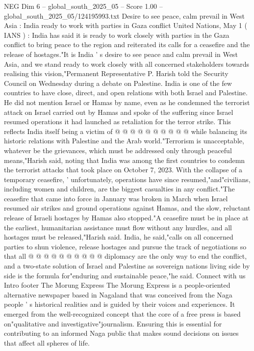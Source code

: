 \begin{textsample}{NEG Dim 6 – global\_south\_2025\_05 – Score 1.00 – global\_south\_2025\_05/124195993.txt}  \label{ex:f6_neg_393}
Desire to see peace, calm prevail in West Asia : India ready to work with parties in Gaza conflict United Nations, May 1 ( IANS ) : India has said it is ready to work closely with parties in the Gaza conflict to bring peace to the region and reiterated its calls for a ceasefire and the release of hostages."It is India ' s desire to see peace and calm prevail in West Asia, and we stand ready to work closely with all concerned stakeholders towards realising this vision,"Permanent Representative P.
Harish told the Security Council on Wednesday during a debate on Palestine.
India is one of the few countries to have close, direct, and open relations with both Israel and Palestine.
He did not mention Israel or Hamas by name, even as he condemned the terrorist attack on Israel carried out by Hamas and spoke of the suffering since Israel resumed operations it had launched as retaliation for the terror strike.
This reflects India itself being a victim of @ @ @ @ @ @ @ @ @ @ while balancing its historic relations with Palestine and the Arab world."Terrorism is unacceptable, whatever be the grievances, which must be addressed only through peaceful means,"Harish said, noting that India was among the first countries to condemn the terrorist attacks that took place on October 7, 2023.
With the collapse of a temporary ceasefire, ' unfortunately, operations have since resumed,"and"civilians, including women and children, are the biggest casualties in any conflict."The ceasefire that came into force in January was broken in March when Israel resumed air strikes and ground operations against Hamas, and the slow, reluctant release of Israeli hostages by Hamas also stopped."A ceasefire must be in place at the earliest, humanitarian assistance must flow without any hurdles, and all hostages must be released,"Harish said.
India, he said,"calls on all concerned parties to shun violence, release hostages and pursue the track of negotiations so that all @ @ @ @ @ @ @ @ @ @ diplomacy are the only way to end the conflict, and a two-state solution of Israel and Palestine as sovereign nations living side by side is the formula for"enduring and sustainable peace,"he said.
Connect with us Intro footer The Morung Express The Morung Express is a people-oriented alternative newspaper based in Nagaland that was conceived from the Naga people ' s historical realities and is guided by their voices and experiences.
It emerged from the well-recognized concept that the core of a free press is based on"qualitative and investigative"journalism.
Ensuring this is essential for contributing to an informed Naga public that makes sound decisions on issues that affect all spheres of life.

\end{textsample}
